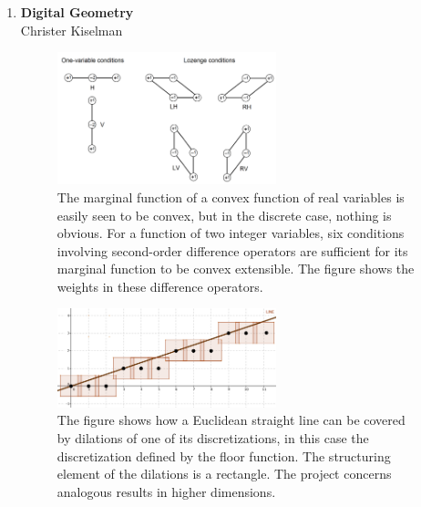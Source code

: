 {\begin{enumerate}
\newpage

%

\item 
\textbf{Digital Geometry}\\
Christer Kiselman\\

\begin{figure}[!htbp]
	\centering
	\includegraphics[width=0.6\textwidth]{figures/research/fig1new.png}
	\caption{\label{fig:crister1} The marginal function of a convex function of real variables is easily seen to be convex, but in the discrete case, nothing is obvious.  For a function of two integer variables, six conditions involving second-order difference operators are sufficient for its marginal function to be convex extensible.  The figure shows the weights in these difference operators.} 
\end{figure}

\begin{figure}[!htbp]
	\centering
	\includegraphics[width=0.6\textwidth]{figures/research/CoveringUFloor.png}
	\caption{\label{fig:crister2} The figure shows how a Euclidean straight line can be covered by dilations of one of its discretizations, in this case the discretization defined by the floor function.  The structuring element of the dilations is a rectangle.  The project concerns analogous results in higher dimensions.} 
\end{figure}


\end{enumerate}}
